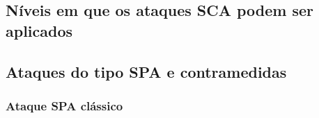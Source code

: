 \subsection{Níveis em que os ataques SCA podem ser aplicados}

\begin{comment}
\subsubsection{Operações na curva}
\subsubsection{Operações no protocolo criptográfico}
\subsubsection{Transferência da chave entre diferentes memórias}
\subsubsection{Protocolo em nível de aplicação}
\end{comment}





\subsection{Ataques do tipo SPA e contramedidas}

\subsubsection{Ataque SPA clássico}

\begin{comment}
1.	Ataque SPA à alg. ECSM binário left-to-right (Dbl-and-Add not Always)
	a.	Se impl não é de tempo constante, então é possível realizar ataque de tempo.
		i.	P.ex., se usa if and else, então pode-se determinar a cada iteração qual bloco, if ou else, é tomado.
b.	Se é de tempo constante, SPA (com ou sem power model) pode ser aplicado para distinguir os padrões no trace das iterações com apenas DBL (bit=0) daquelas com DBL+ADD (bit=1).
\end{comment}

